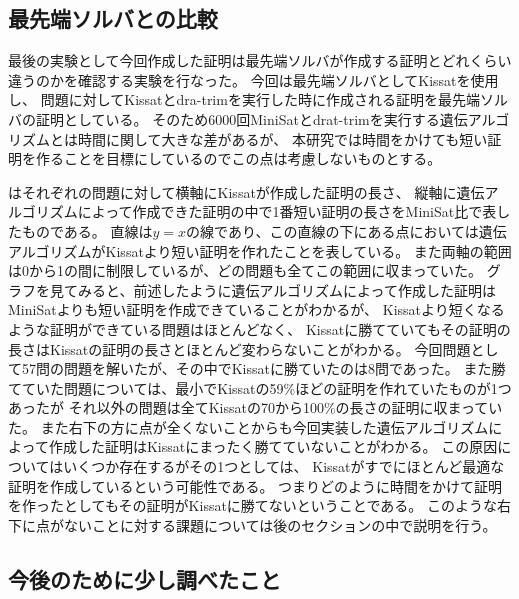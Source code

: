 \subsection{最先端ソルバとの比較}

最後の実験として今回作成した証明は最先端ソルバが作成する証明とどれくらい違うのかを確認する実験を行なった。
今回は最先端ソルバとしてKissatを使用し、
問題に対してKissatとdra-trimを実行した時に作成される証明を最先端ソルバの証明としている。
そのため6000回MiniSatとdrat-trimを実行する遺伝アルゴリズムとは時間に関して大きな差があるが、
本研究では時間をかけても短い証明を作ることを目標にしているのでこの点は考慮しないものとする。


はそれぞれの問題に対して横軸にKissatが作成した証明の長さ、
縦軸に遺伝アルゴリズムによって作成できた証明の中で1番短い証明の長さをMiniSat比で表したものである。
直線は$y=x$の線であり、この直線の下にある点においては遺伝アルゴリズムがKissatより短い証明を作れたことを表している。
また両軸の範囲は0から1の間に制限しているが、どの問題も全てこの範囲に収まっていた。
グラフを見てみると、前述したように遺伝アルゴリズムによって作成した証明はMiniSatよりも短い証明を作成できていることがわかるが、
Kissatより短くなるような証明ができている問題はほとんどなく、
Kissatに勝てていてもその証明の長さはKissatの証明の長さとほとんど変わらないことがわかる。
今回問題として57問の問題を解いたが、その中でKissatに勝ていたのは8問であった。
また勝てていた問題については、最小でKissatの59\%ほどの証明を作れていたものが1つあったが
それ以外の問題は全てKissatの70から100\%の長さの証明に収まっていた。
また右下の方に点が全くないことからも今回実装した遺伝アルゴリズムによって作成した証明はKissatにまったく勝てていないことがわかる。
この原因についてはいくつか存在するがその1つとしては、
Kissatがすでにほとんど最適な証明を作成しているという可能性である。
つまりどのように時間をかけて証明を作ったとしてもその証明がKissatに勝てないということである。
このような右下に点がないことに対する課題については後のセクションの中で説明を行う。

\subsection{今後のために少し調べたこと}


